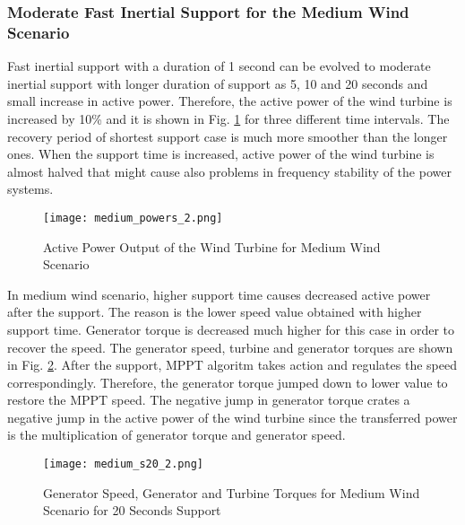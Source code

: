 \subsubsection{Moderate Fast Inertial Support for the Medium Wind Scenario}
Fast inertial support with a duration of 1 second can be evolved to moderate inertial support with longer duration of support as 5, 10 and 20 seconds and small increase in active power. Therefore, the active power of the wind turbine is increased by 10\% and it is shown in Fig. \ref{midpowers} for three different time intervals. The recovery period of shortest support case is much more smoother than the longer ones. When the support time is increased, active power of the wind turbine is almost halved that might cause also problems in frequency stability of the power systems. \par
\begin{figure}[h!]
	\centering
	\texttt{[image: medium\_powers\_2.png]}
	\caption{Active Power Output of the Wind Turbine for Medium Wind Scenario}
	\label{midpowers}
\end{figure}
In medium wind scenario, higher support time causes decreased active power after the support. The reason is the lower speed value obtained with higher support time. Generator torque is decreased much higher for this case in order to recover the speed. The generator speed, turbine and generator torques are shown in Fig. \ref{mid_torques3}. After the support, MPPT algoritm takes action and regulates the speed correspondingly. Therefore, the generator torque jumped down to lower value to restore the MPPT speed. The negative jump in generator torque crates a negative jump in the active power of the wind turbine since the transferred power is the multiplication of generator torque and generator speed.\par
\begin{figure}[h!]
	\centering
	\texttt{[image: medium\_s20\_2.png]}
	\caption{Generator Speed, Generator and Turbine Torques for Medium Wind Scenario for 20 Seconds Support}
	\label{mid_torques3}
\end{figure}

